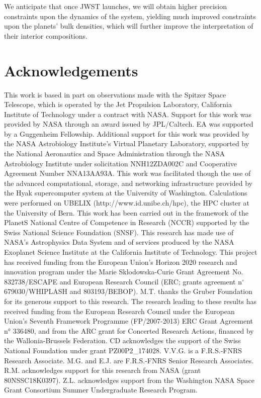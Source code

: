 \documentclass[twocolumn]{aastex63}
\begin{document}
We anticipate that once JWST launches, we will obtain higher precision constraints upon the dynamics of the system, yielding much improved constraints upon the planets' bulk densities, which will further improve the interpretation of their interior compositions.

\section*{Acknowledgements}

This work is based in part on observations made with the Spitzer Space Telescope, which 
is operated by the Jet Propulsion Laboratory, California Institute of Technology under 
a contract with NASA. Support for this work was provided by NASA through an award issued 
by JPL/Caltech.  EA was supported by a Guggenheim Fellowship.  Additional support for this 
work was provided by the NASA Astrobiology Institute’s Virtual Planetary Laboratory, 
supported by the National  Aeronautics and Space Administration through the NASA Astrobiology 
Institute under solicitation NNH12ZDA002C and Cooperative Agreement Number NNA13AA93A.  
This work was facilitated though the use of the advanced computational, storage, and 
networking infrastructure provided by the Hyak supercomputer system at the University of 
Washington. Calculations were performed on UBELIX (http://www.id.unibe.ch/hpc), the HPC 
cluster at the University of Bern. This work has been carried out in the framework of the PlanetS National Centre 
of Competence in Research (NCCR) supported by the Swiss National Science Foundation (SNSF). 
This research has made use of NASA's Astrophysics Data System and of services produced by 
the NASA Exoplanet Science Institute at the California Institute of Technology.
This project has received funding from the European Union’s Horizon 2020 research and 
innovation program under the Marie Sklodowska-Curie Grant Agreement No. 832738/ESCAPE and European Research Council (ERC; grants agreement n$^\circ$ 679030/WHIPLASH and 803193/BEBOP). M.T. 
thanks the Gruber Foundation for its generous support to this research.
The research leading to these results has received funding from the European Research Council 
under the European Union's Seventh Framework Programme (FP/2007-2013) ERC Grant 
Agreement n° 336480, and from the ARC grant for Concerted Research Actions, financed by the
Wallonia-Brussels Federation. CD acknowledges the support of the Swiss National Foundation under grant PZ00P2\_174028. V.V.G. is a F.R.S.-FNRS Research Associate. M.G. and E.J. are F.R.S.-FNRS Senior Research Associates. R.M. acknowledges support for this research from NASA (grant 80NSSC18K0397). Z.L. acknowledges support from the Washington NASA Space Grant Consortium Summer Undergraduate Research Program. 
\end{document}
